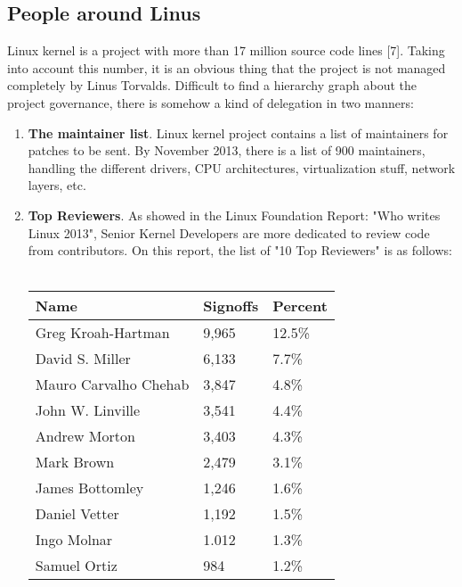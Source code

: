 \documentclass[11pt]{article}
\begin{document}
\subsection{People around Linus}
Linux kernel is a project with more than 17 million source code lines [7]. Taking into account this number, it is an obvious thing that the project is not managed completely by Linus Torvalds. Difficult to find a hierarchy graph about the project governance, there is somehow a kind of delegation in two manners:
\begin{enumerate}
\item{\textbf{The maintainer list}}. Linux kernel project contains a list of maintainers for patches to be sent. By November 2013, there is a list of 900 maintainers, handling the different drivers, CPU architectures, virtualization stuff, network layers, etc.
\item{\textbf{Top Reviewers}}. As showed in the Linux Foundation Report: "Who writes Linux 2013", Senior Kernel Developers are more dedicated to review code from contributors. On this report, the list of "10 Top Reviewers" is as follows:\\
\\
\begin{center}
    \begin{tabular}{ | l | l | l | }
    \hline
    Name & Signoffs & Percent \\
    \hline
    Greg Kroah-Hartman    & 9,965 & 12.5\%\\
    David S. Miller       & 6,133 &  7.7\%\\ 
    Mauro Carvalho Chehab & 3,847 &  4.8\%\\
    John W. Linville      & 3,541 &  4.4\%\\
    Andrew Morton         & 3,403 &  4.3\%\\
    Mark Brown            & 2,479 &  3.1\%\\
    James Bottomley       & 1,246 &  1.6\%\\
    Daniel Vetter         & 1,192 &  1.5\%\\
    Ingo Molnar           & 1.012 &  1.3\%\\
    Samuel Ortiz          &   984 &  1.2\%\\
    \hline
    \end{tabular}
\end{center}


\end{enumerate}
\end{document}
